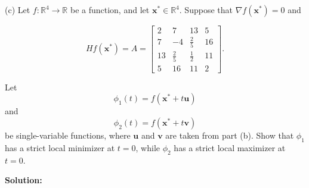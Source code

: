 \documentclass{article}
\begin{document}
(c) Let $f: \mathbb{R}^4 \to \mathbb{R}$ be a function, and let $\mathbf{x}^* \in \mathbb{R}^4$. Suppose that $\nabla f(\mathbf{x}^*) = 0$ and

$$Hf(\mathbf{x}^*) = A = \begin{bmatrix} 2 & 7 & 13 & 5 \\ 7 & -4 & \frac{2}{5} & 16 \\ 13 & \frac{2}{5} & \frac{1}{2} & 11 \\ 5 & 16 & 11 & 2 \end{bmatrix}.$$

Let $$\phi_1(t) = f(\mathbf{x}^* + t\mathbf{u})$$ and $$\phi_2(t) = f(\mathbf{x}^* + t\mathbf{v})$$ be single-variable functions, where $\mathbf{u}$ and $\mathbf{v}$ are taken from part (b). Show that $\phi_1$ has a strict local minimizer at $t = 0$, while $\phi_2$ has a strict local maximizer at $t = 0$.

\textbf{Solution: } \\
\end{document}
